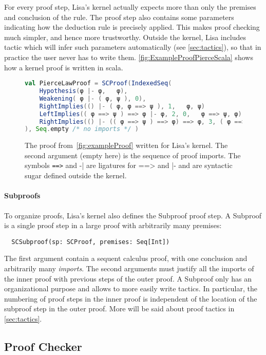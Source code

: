 For every proof step, Lisa's kernel actually expects more than only the premises and conclusion of the rule. The proof step also contains some parameters indicating how the deduction rule is precisely applied. This makes proof checking much simpler, and hence more trustworthy. Outside the kernel, Lisa includes tactic which will infer such parameters automatically (see \autoref{sec:tactics}), so that in practice the user never has to write them.
\autoref{fig:ExampleProofPierceScala} shows how a kernel proof is written in scala.

\begin{figure}[ht]
  \centering
  \begin{lstlisting}[language=scala, showspaces=false]
val PierceLawProof = SCProof(IndexedSeq(
    Hypothesis(φ |- φ,   φ),
    Weakening( φ |- ( φ, ψ ), 0),
    RightImplies(() |- ( φ, φ ==> ψ ), 1,   φ, ψ)
    LeftImplies(( φ ==> ψ ) ==> φ |- φ, 2, 0,   φ ==> ψ, φ),
    RightImplies(() |- (( φ ==> ψ ) ==> φ) ==> φ, 3, ( φ ==> ψ ) ==> φ, φ)
), Seq.empty /* no imports */ )
    \end{lstlisting}
  \caption{The proof from~\autoref{fig:exampleProof} written for Lisa's kernel. The second argument (empty here) is the sequence of proof imports. The symbols \lstinline|==>| and \lstinline||-| are ligatures for ==> and |- and are syntactic sugar defined outside the kernel.}
  \label{fig:ExampleProofPierceScala}
\end{figure}

\paragraph*{Subproofs}
To organize proofs, Lisa's kernel also defines the Subproof proof step. A Subproof is a single proof step in a large proof with arbitrarily many premises:
\begin{lstlisting}
  SCSubproof(sp: SCProof, premises: Seq[Int])
\end{lstlisting}
The first argument contain a sequent calculus proof, with one conclusion and arbitrarily many \textit{imports}. The second arguments must justify all the imports of the inner proof with previous steps of the outer proof.
A Subproof only has an organizational purpose and allows to more easily write tactics. In particular, the numbering of proof steps  in the inner proof is independent of the location of the subproof step in the  outer proof. More will be said about proof tactics in \autoref{sec:tactics}.

\subsection{Proof Checker}
\label{subsec:proofchecker}


